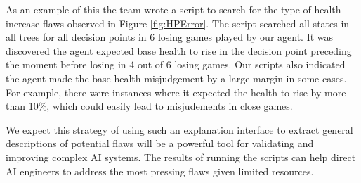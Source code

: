 \documentclass{article}
\begin{document}
As an example of this the team wrote a script to search for the type of health increase flaws observed in Figure \ref{fig:HPError}. The script searched all states in all trees for all decision points in 6 losing games played by our agent. It was discovered the agent expected base health to rise in the decision point preceding the moment before losing in 4 out of 6 losing games. Our scripts also indicated the agent made the base health misjudgement by a large margin in some cases. For example, there were instances where it expected the health to rise by more than 10\%, which could easily lead to misjudements in close games. 

We expect this strategy of using such an explanation interface to extract general descriptions of potential flaws will be a powerful tool for validating and improving complex AI systems. The results of running the scripts can help direct AI engineers to address the most pressing flaws given limited resources. 




\end{document}
